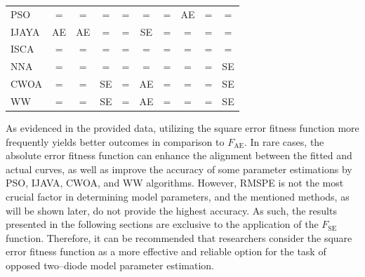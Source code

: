 \documentclass[a4paper,fleqn]{cas-sc}
\begin{document}
\begin{table}[<options>]
\begin{tabular*}{\tblwidth}{@{}LCCCCCCCCC@{}}
PSO &=  &=  &=  &=  &=  &=  & AE &=  &=  \\
IJAYA & AE & AE & = &=  &SE & = & = &=  &=  \\
ISCA &=  &=  &=  &=  &=  &=  &=  &=  &=  \\
NNA &=  &=  &=  &=  &=  &=  &=  &=  & SE\\
CWOA &=  &=  & SE&=  &  AE&=  &=  &=  &SE \\
WW &=  &=  & SE& = & AE & = &=  &=  & SE\\
\bottomrule
\end{tabular*}
\end{table}

As evidenced in the provided data, utilizing the square error fitness function more frequently yields better outcomes in comparison to $F_\mathrm{AE}$.
In rare cases, the absolute error fitness function can enhance the alignment between the fitted and actual curves,
as well as improve the accuracy of some parameter estimations by PSO, IJAVA, CWOA, and WW algorithms.
However, RMSPE is not the most crucial factor in determining model parameters, and the mentioned methods,
as will be shown later, do not provide the highest accuracy.
As such, the results presented in the following sections are exclusive to the application of the $F_\mathrm{SE}$ function.
Therefore, it can be recommended that researchers consider
the square error fitness function as a more effective and reliable option for the task of opposed two--diode model parameter estimation.
\end{document}
